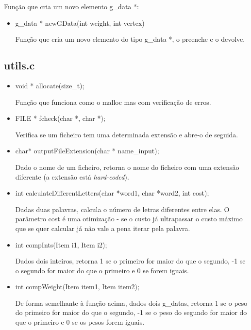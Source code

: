 \documentclass[a4paper, 11pt]{article}
\begin{document}
	\par Função que cria um novo elemento g{\_}data *:
        \begin{itemize}  

	\item g{\_}data * newGData(int weight, int vertex)
	\par Função que cria um novo elemento do tipo g{\_}data *, o preenche e o devolve.
    \end{itemize}
    
\subsection{utils.c}
    \begin{itemize}
    \item void * allocate(size{\_}t);
    \par Função que funciona como o malloc mas com verificação de erros.
    
    \item FILE * fcheck(char *, char *);
    \par Verifica se um ficheiro tem uma determinada extensão e abre-o de seguida.
    
    \item char* outputFileExtension(char * name{\_}input);
    \par Dado o nome de um ficheiro, retorna o nome do ficheiro com uma extensão diferente (a extensão está \textit{hard-coded}).
    
    \item int calculateDifferentLetters(char *word1, char *word2, int cost);
    \par Dadas duas palavras, calcula o número de letras diferentes entre elas. O parâmetro cost é uma otimização - se o custo já ultrapassar o custo máximo que se quer calcular já não vale a pena iterar pela palavra.
    
    \item int compInts(Item i1, Item i2);
    \par Dados dois inteiros, retorna 1 se o primeiro for maior do que o segundo, -1 se o segundo for maior do que o primeiro e 0 se forem iguais.
    
    \item int compWeight(Item item1, Item item2);
    \par De forma semelhante à função acima, dados dois g{\_}datas, retorna 1 se o peso do primeiro for maior do que o segundo, -1 se o peso do segundo for maior do que o primeiro e 0 se os pesos forem iguais.
    

\end{itemize}
\end{document}
